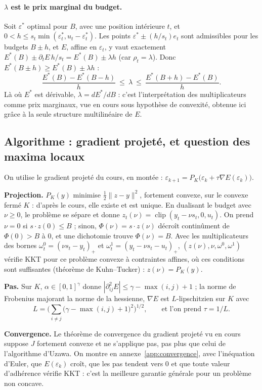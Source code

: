 \documentclass[11pt,a4paper]{article}
\newcommand{\nr}[1]{\|#1\|}
\newcommand{\clip}{\operatorname{clip}}
\theoremstyle{plain}
\begin{document}
\paragraph{$\lambda$ est le prix marginal du budget.} Soit $\varepsilon^*$ optimal pour $B$, avec une position intérieure $t$, et $0<h\le s_t\min(\varepsilon^*_t,u_t-\varepsilon^*_t)$. Les points $\varepsilon^*\pm(h/s_t)e_t$ sont admissibles pour les budgets $B\pm h$, et $E$, affine en $\varepsilon_t$, y vaut exactement $E^*(B)\pm\partial_tE\,h/s_t=E^*(B)\pm\lambda h$ (car $\rho_t=\lambda$). Donc $E^*(B\pm h)\ge E^*(B)\pm\lambda h$ :
\begin{equation}\label{eq:encadrement}
\frac{E^*(B)-E^*(B-h)}{h}\ \le\ \lambda\ \le\ \frac{E^*(B+h)-E^*(B)}{h}.
\end{equation}
Là où $E^*$ est dérivable, $\lambda=dE^*/dB$ : c'est l'interprétation des multiplicateurs comme prix marginaux, vue en cours sous hypothèse de convexité, obtenue ici grâce à la seule structure multilinéaire de $E$.

\subsection{Algorithme : gradient projeté, et question des maxima locaux}\label{sec:algoII}
On utilise le gradient projeté du cours, en montée : $\varepsilon_{k+1}=P_K\big(\varepsilon_k+\tau\nabla E(\varepsilon_k)\big)$.

\textbf{Projection.} $P_K(y)$ minimise $\tfrac12\nr{z-y}^2$, fortement convexe, sur le convexe fermé $K$ : d'après le cours, elle existe et est unique. En dualisant le budget avec $\nu\ge0$, le problème se sépare et donne $z_t(\nu)=\clip(y_t-\nu s_t,0,u_t)$. On prend $\nu=0$ si $s\cdot z(0)\le B$ ; sinon, $\Phi(\nu)=s\cdot z(\nu)$ décroît continûment de $\Phi(0)>B$ à $0$, et une dichotomie trouve $\Phi(\nu)=B$. Avec les multiplicateurs des bornes $\omega^0_t=(\nu s_t-y_t)_+$ et $\omega^1_t=(y_t-\nu s_t-u_t)_+$, $(z(\nu),\nu,\omega^0,\omega^1)$ vérifie KKT pour ce problème convexe à contraintes affines, où ces conditions sont suffisantes (théorème de Kuhn--Tucker) : $z(\nu)=P_K(y)$.

\textbf{Pas.} Sur $K$, $\alpha\in[0,1]^\gamma$ donne $|\partial^2_{ij}E|\le\gamma-\max(i,j)+1$ ; la norme de Frobenius majorant la norme de la hessienne, $\nabla E$ est $L$-lipschitzien sur $K$ avec
\[L=\Big(\sum_{i\ne j}\big(\gamma-\max(i,j)+1\big)^2\Big)^{1/2},\qquad\text{et l'on prend }\tau=1/L.\]

\textbf{Convergence.} Le théorème de convergence du gradient projeté vu en cours suppose $J$ fortement convexe et ne s'applique pas, pas plus que celui de l'algorithme d'Uzawa. On montre en annexe~\ref{app:convergence}, avec l'inéquation d'Euler, que $E(\varepsilon_k)$ croît, que les pas tendent vers 0 et que toute valeur d'adhérence vérifie KKT : c'est la meilleure garantie générale pour un problème non concave.
\end{document}
